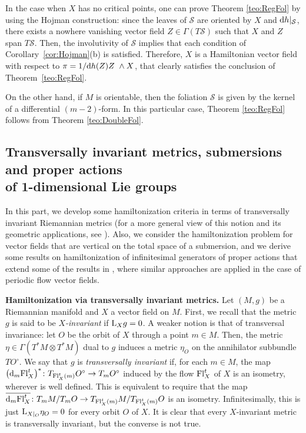 \documentclass[10pt,a4paper]{amsart}
\newcommand{\dd}{{\rm d}}
\numberwithin{equation}{section}
\begin{document}
In the case when $X$ has no critical points, one can prove Theorem \ref{teo:RegFol} by using the Hojman construction: since the leaves of $\mathcal{S}$ are oriented by $X$ and ${\rm d}h|_{\mathcal{S}}$, there exists a nowhere vanishing vector field $Z\in\Gamma(T\mathcal{S})$ such that $X$ and $Z$ span $T\mathcal{S}$. Then, the involutivity of $\mathcal{S}$ implies that each condition of Corollary~\ref{cor:Hojman}(b) is satisfied. Therefore, $X$ is a Hamiltonian vector field with respect to $\pi = {1}/{\dd{h}(Z)}Z\ \wedge X$, that clearly satisfies the conclusion of Theorem~\ref{teo:RegFol}.

On the other hand, if $M$ is orientable, then the foliation $\mathcal{S}$ is given by the kernel of a differential $(m-2)$-form.
In this particular case, Theorem \ref{teo:RegFol} follows from Theorem \ref{teo:DoubleFol}.


 \subsection[Transversally invariant metrics, submersions and proper actions of 1-dimensional Lie groups]
 {Transversally invariant metrics, submersions and proper actions \\of 1-dimensional Lie groups}\label{subsec:Metric}

In this part, we develop some hamiltonization criteria in terms of transversally invariant Riemannian metrics (for a more general view of this notion and its geometric applications, see \cite{del_Hoyo_2018, PPT-2014}). Also, we consider the hamiltonization problem for vector fields that are vertical on the total space of a submersion, and we derive some results on hamiltonization of infinitesimal generators of proper actions that extend some of the results in \cite{FGS-05}, where similar approaches are applied in the case of periodic flow vector fields.

{\bf Hamiltonization via transversally invariant metrics.} Let $(M,g)$ be a Riemannian manifold and $X$ a vector field on $M$. First, we recall that the metric $g$ is said to be \emph{$X$-invariant} if ${\rm L}_{X}g = 0$. A weaker notion is that of transversal invariance: let $O$ be the orbit of $X$ through a point $m \in M$. Then, the metric $\eta \in \Gamma(T^{*}M \otimes T^{*}M)$ dual to $g$ induces a metric $\eta_{O}$ on the annihilator subbundle $TO^{\circ}$. We say that $g$ is \emph{transversally invariant} if, for each $m \in M$, the map $\big(\dd_{m}{\rm Fl}^{t}_{X}\big)^{*}\colon T_{{\rm Fl}^{t}_{X}(m)}O^{\circ}\to T_{m}O^{\circ}$ induced by the flow ${\rm Fl}^{t}_{X}$ of $X$ is an isometry, wherever is well defined. This is equivalent to require that the map $\overline{\dd_{m}{\rm Fl}^{t}_{X}}\colon T_{m}M / T_{m}O \to T_{{\rm Fl}^{t}_{X}(m)}M / T_{{\rm Fl}^{t}_{X}(m)}O$ is an isometry. Infinitesimally, this is just ${\rm L}_{X|_{O}}\eta_{O} = 0$ for every orbit $O$ of $X$. It is clear that every $X$-invariant metric is transversally invariant, but the converse is not true.
\end{document}
